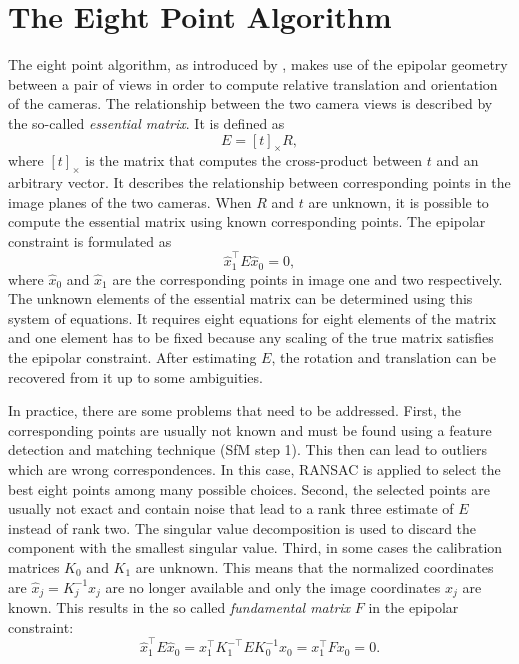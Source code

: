	\section{The Eight Point Algorithm}
		The eight point algorithm, as introduced by \cite{longuet1981}, makes use of the epipolar geometry between a pair of views in order to compute relative translation and orientation of the cameras.
		The relationship between the two camera views is described by the so-called \emph{essential matrix}.
		It is defined as 
		\begin{equation}\label{eq:essential_matrix}
			E = \left[ t \right]_\times \! R,
		\end{equation}
		where $\left[ t \right]_\times$ is the matrix that computes the cross-product between $t$ and an arbitrary vector.
		It describes the relationship between corresponding points in the image planes of the two cameras.
		When $R$ and $t$ are unknown, it is possible to compute the essential matrix using known corresponding points.
		The epipolar constraint is formulated as 
		\begin{equation}\label{eq:epipolar_constraint}
			\hat{x}_1^\top E \hat{x}_0 = 0,
		\end{equation}
		where $\hat{x}_0$ and $\hat{x}_1$ are the corresponding points in image one and two respectively.
		The unknown elements of the essential matrix can be determined using this system of equations.
		It requires eight equations for eight elements of the matrix and one element has to be fixed because any scaling of the true matrix satisfies the epipolar constraint.
		After estimating $E$, the rotation and translation can be recovered from it up to some ambiguities.
		
		In practice, there are some problems that need to be addressed.
		First, the corresponding points are usually not known and must be found using a feature detection and matching technique (SfM step 1).
		This then can lead to outliers which are wrong correspondences.
		In this case, {RANSAC} is applied to select the best eight points among many possible choices.
		Second, the selected points are usually not exact and contain noise that lead to a rank three estimate of $E$ instead of rank two.
		The singular value decomposition is used to discard the component with the smallest singular value.
		Third, in some cases the calibration matrices $K_0$ and $K_1$ are unknown.
		This means that the normalized coordinates are $\hat{x}_j = K_j^{-1} x_j$ are no longer available and only the image coordinates $x_j$ are known.
		This results in the so called \emph{fundamental matrix} $F$ in the epipolar constraint:
		\begin{equation}
			\hat{x}_1^\top E \hat{x}_0 = x_1^\top K_1^{-\top} E K_0^{-1} x_0 = x_1^\top F x_0 = 0.
		\end{equation}
		

